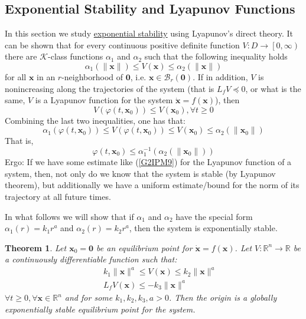 \documentclass[a4paper,10pt,oneside]{book}
\newtheorem{theorem}{Theorem}
\begin{document}
\subsection{Exponential Stability and Lyapunov Functions}
In this section we study \hyperlink{exp-stability}{exponential stability} using Lyapunov's direct
theory. It can be shown that for every continuous positive definite function $V:D\to\left[0,\infty \right)$
there are $\mathcal{K}$-class functions $\alpha_1$ and $\alpha_2$ such that the following inequality
holds
\begin{equation}\label{G2IPM9}
 \alpha_1(\|\mathbf{x}\|) \leq V(\mathbf{x}) \leq \alpha_2(\|\mathbf{x}\|)
\end{equation}
for all $\mathbf{x}$ in an $r$-neighborhood of $\mathbf{0}$, i.e. $\mathbf{x}\in\mathcal{B}_r(\mathbf{0})$.
If in addition, $V$ is nonincreasing along the trajectories of the system (that is $L_f V\preceq 0$, or what is
the same, $V$ is a Lyapunov function for the system $\dot{\mathbf{x}}=f(\mathbf{x})$), then
\begin{equation}
 V(\varphi(t,\mathbf{x}_0)) \leq V(\mathbf{x}_0),\forall t\geq 0
\end{equation}
Combining the last two inequalities, one has that:
\begin{equation}
 \alpha_1(\varphi(t,\mathbf{x}_0)) \leq V(\varphi(t,\mathbf{x}_0)) \leq V(\mathbf{x}_0) \leq \alpha_2(\|\mathbf{x}_0\|)
\end{equation}
That is,
\begin{equation}
 \varphi(t,\mathbf{x}_0) \leq \alpha_1^{-1}(\alpha_2(\|\mathbf{x}_0\|))
\end{equation}
Ergo: If we have some estimate like (\ref{G2IPM9}) for the Lyapunov function of a system, then, not
only do we know that the system is stable (by Lyapunov theorem), but additionally we have a uniform
estimate/bound for the norm of its trajectory at all future times. 

 In what follows we will show that if $\alpha_1$ and $\alpha_2$ have the special form 
$\alpha_1(r)=k_1r^a$ and $\alpha_2(r)=k_2r^a$, then the system is exponentially stable.

\begin{theorem}
 Let $\mathbf{x}_0=\mathbf{0}$ be an equilibrium point for $\dot{\mathbf{x}}=f(\mathbf{x})$. Let
$V:\mathbb{R}^n\to\mathbb{R}$ be a continuously differentiable function such that:
\begin{eqnarray}
 && k_1\|\mathbf{x}\|^a \leq V(\mathbf{x}) \leq k_2\|\mathbf{x}\|^a\\
&& L_fV(\mathbf{x})\leq -k_3 \|\mathbf{x}\|^a
\end{eqnarray}
$\forall t\geq 0, \forall \mathbf{x}\in\mathbb{R}^n$ and for some $k_1,k_2,k_3,a>0$. Then the
origin is a globally exponentially stable equilibrium point for the system.
\end{theorem}
\end{document}
